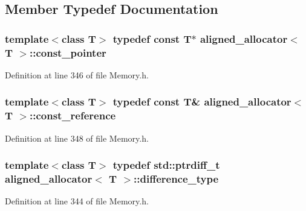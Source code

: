 \subsection{Member Typedef Documentation}
\hypertarget{classaligned__allocator_aee8cbc399662a1e70c84c39f8069e838}{
\subsubsection[{const\-\_\-pointer}]{\setlength{\rightskip}{0pt plus 5cm}template$<$class T$>$ typedef const T$\ast$ {\bf aligned\-\_\-allocator}$<$ T $>$\-::{\bf const\-\_\-pointer}}}\label{classaligned__allocator_aee8cbc399662a1e70c84c39f8069e838}


Definition at line 346 of file Memory.\-h.

\hypertarget{classaligned__allocator_ae809f97ebe11807c77db507b9ae93afc}{
\subsubsection[{const\-\_\-reference}]{\setlength{\rightskip}{0pt plus 5cm}template$<$class T$>$ typedef const T\& {\bf aligned\-\_\-allocator}$<$ T $>$\-::{\bf const\-\_\-reference}}}\label{classaligned__allocator_ae809f97ebe11807c77db507b9ae93afc}


Definition at line 348 of file Memory.\-h.

\hypertarget{classaligned__allocator_a0611a3b4581a17616eaaf9f0d5b27cbb}{
\subsubsection[{difference\-\_\-type}]{\setlength{\rightskip}{0pt plus 5cm}template$<$class T$>$ typedef {\bf std\-::ptrdiff\-\_\-t} {\bf aligned\-\_\-allocator}$<$ T $>$\-::{\bf difference\-\_\-type}}}\label{classaligned__allocator_a0611a3b4581a17616eaaf9f0d5b27cbb}


Definition at line 344 of file Memory.\-h.

